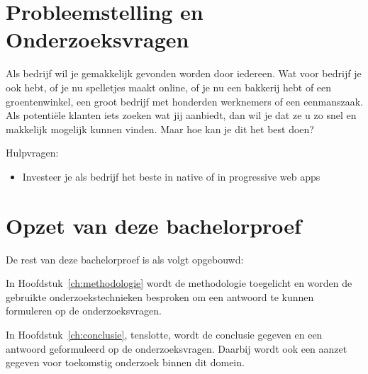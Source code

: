 




\section{Probleemstelling en Onderzoeksvragen}
\label{sec:onderzoeksvragen}


Als bedrijf wil je gemakkelijk gevonden worden door iedereen. Wat voor bedrijf je ook hebt, of je nu spelletjes maakt online, of je nu een bakkerij hebt of een groentenwinkel, een groot bedrijf met honderden werknemers of een eenmanszaak. Als potentiële klanten iets zoeken wat jij aanbiedt, dan wil je dat ze u zo snel en makkelijk mogelijk kunnen vinden. Maar hoe kan je dit het best doen? 

Hulpvragen:
\begin{itemize}  
	\item Investeer je als bedrijf het beste in native of in progressive web apps
\end{itemize}



\section{Opzet van deze bachelorproef}
\label{sec:opzet-bachelorproef}


De rest van deze bachelorproef is als volgt opgebouwd:

In Hoofdstuk~\ref{ch:methodologie} wordt de methodologie toegelicht en worden de gebruikte onderzoekstechnieken besproken om een antwoord te kunnen formuleren op de onderzoeksvragen.


In Hoofdstuk~\ref{ch:conclusie}, tenslotte, wordt de conclusie gegeven en een antwoord geformuleerd op de onderzoeksvragen. Daarbij wordt ook een aanzet gegeven voor toekomstig onderzoek binnen dit domein.

